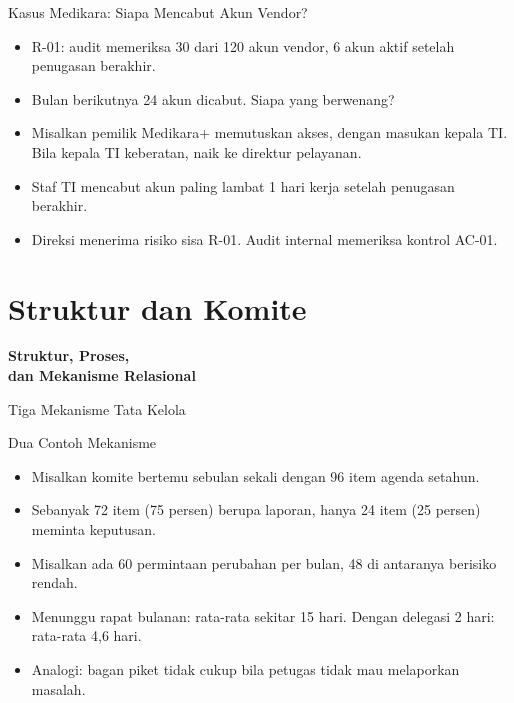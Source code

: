 \documentclass[aspectratio=169, table, 12pt]{beamer}
\begin{document}
\begin{frame}{{\Large Kasus Medikara: Siapa Mencabut Akun Vendor?}}
  \vspace{4pt}
  \small
  \begin{itemize}
    \item R-01: audit memeriksa 30 dari 120 akun vendor, 6 akun aktif setelah penugasan berakhir.
    \item Bulan berikutnya 24 akun dicabut. Siapa yang berwenang?
    \item Misalkan pemilik Medikara+ memutuskan akses, dengan masukan kepala TI. Bila kepala TI
          keberatan, naik ke direktur pelayanan.
    \item Staf TI mencabut akun paling lambat 1 hari kerja setelah penugasan berakhir.
    \item Direksi menerima risiko sisa R-01. Audit internal memeriksa kontrol AC-01.
  \end{itemize}
\end{frame}

\section{Struktur dan Komite}

\begin{frame}{\hfill}
  \centering
  \Huge{\textbf{Struktur, Proses,\\dan Mekanisme Relasional}}
\end{frame}

\begin{frame}{{\Large Tiga Mekanisme Tata Kelola}}
  \centering
  \resizebox{!}{0.7\textheight}{}
\end{frame}

\begin{frame}{{\Large Dua Contoh Mekanisme}}
  \vspace{4pt}
  \small
  \begin{itemize}
    \item Misalkan komite bertemu sebulan sekali dengan 96 item agenda setahun.
    \item Sebanyak 72 item (75 persen) berupa laporan, hanya 24 item (25 persen) meminta keputusan.
    \item Misalkan ada 60 permintaan perubahan per bulan, 48 di antaranya berisiko rendah.
    \item Menunggu rapat bulanan: rata-rata sekitar 15 hari. Dengan delegasi 2 hari: rata-rata 4,6 hari.
    \item Analogi: bagan piket tidak cukup bila petugas tidak mau melaporkan masalah.
  \end{itemize}
\end{frame}
\end{document}

